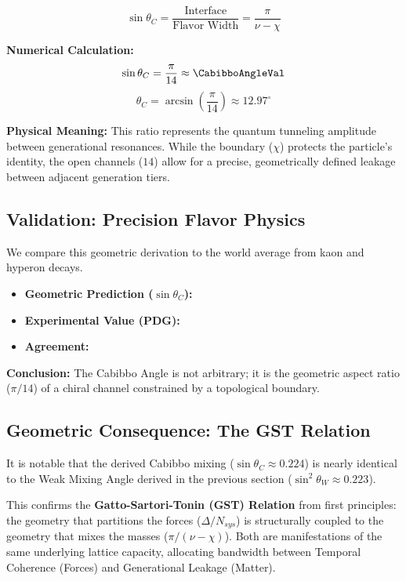 \begin{equation}
\sin \theta_C = \frac{\text{Interface}}{\text{Flavor Width}} = \frac{\pi}{\nu - \chi}
\end{equation}

\textbf{Numerical Calculation:}
\begin{equation}
\sin \theta_C = \frac{\pi}{14} \approx \mathbf{\CabibboAngleVal}
\end{equation}
\begin{equation}
\theta_C = \arcsin\left(\frac{\pi}{14}\right) \approx 12.97^\circ
\end{equation}

\textbf{Physical Meaning:} This ratio represents the quantum tunneling amplitude between generational resonances. While the boundary ($\chi$) protects the particle's identity, the open channels ($14$) allow for a precise, geometrically defined leakage between adjacent generation tiers.

\subsection{Validation: Precision Flavor Physics}
We compare this geometric derivation to the world average from kaon and hyperon decays.

\begin{itemize}
    \item \textbf{Geometric Prediction ($\sin \theta_C$):} \CabibboAngleVal
    \item \textbf{Experimental Value (PDG):} \CabibboAngleExperimentalValue
    \item \textbf{Agreement:} \CabibboAngleAccText
\end{itemize}

\textbf{Conclusion:} The Cabibbo Angle is not arbitrary; it is the geometric aspect ratio ($\pi/14$) of a chiral channel constrained by a topological boundary.

\subsection{Geometric Consequence: The GST Relation}
It is notable that the derived Cabibbo mixing ($\sin \theta_C \approx 0.224$) is nearly identical to the Weak Mixing Angle derived in the previous section ($\sin^2 \theta_W \approx 0.223$). 

This confirms the \textbf{Gatto-Sartori-Tonin (GST) Relation} from first principles: the geometry that partitions the forces ($\Delta/N_{sys}$) is structurally coupled to the geometry that mixes the masses ($\pi/(\nu-\chi)$). Both are manifestations of the same underlying lattice capacity, allocating bandwidth between Temporal Coherence (Forces) and Generational Leakage (Matter).